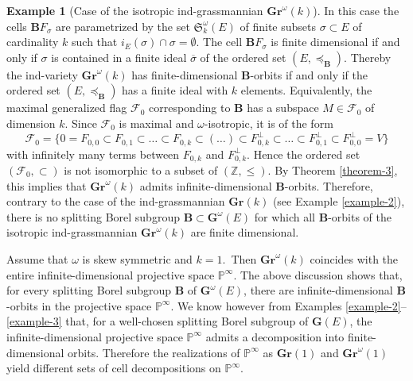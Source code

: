 \documentclass[12pt]{amsart}
\theoremstyle{definition}
\newtheorem{example}{Example}
\begin{document}
\begin{example}[Case of the isotropic ind-grassmannian $\mathbf{Gr}^\omega(k)$]
In this case the cells $\mathbf{B}F_\sigma$ are parametrized by the set $\mathfrak{S}_k^\omega(E)$ of finite subsets $\sigma\subset E$ of cardinality $k$ such that $i_E(\sigma)\cap\sigma=\emptyset$.
The cell $\mathbf{B}F_\sigma$ is finite dimensional if and only if $\sigma$ is contained in a finite ideal $\overline{\sigma}$ of the ordered set $(E,\preceq_\mathbf{B})$. Thereby the ind-variety $\mathbf{Gr}^\omega(k)$ has finite-dimensional $\mathbf{B}$-orbits if and only if the ordered set $(E,\preceq_\mathbf{B})$ has a finite ideal with $k$ elements.
Equivalently, the maximal generalized flag $\mathcal{F}_0$ corresponding to $\mathbf{B}$ has a subspace $M\in\mathcal{F}_0$ of dimension $k$. Since $\mathcal{F}_0$ is maximal and $\omega$-isotropic, it is of the form
\[\mathcal{F}_0=\{0=F_{0,0}\subset F_{0,1}\subset\ldots\subset F_{0,k}\subset(\ldots)\subset F_{0,k}^\perp\subset\ldots\subset F_{0,1}^\perp\subset F_{0,0}^\perp=V\}\]
with infinitely many terms between $F_{0,k}$ and $F_{0,k}^\perp$.
Hence the ordered set $(\mathcal{F}_0,\subset)$ is not isomorphic to a subset of $(\mathbb{Z},\leq)$. By Theorem \ref{theorem-3}, this implies that $\mathbf{Gr}^\omega(k)$ admits infinite-dimensional $\mathbf{B}$-orbits. Therefore, contrary to the case of the  ind-grassmannian $\mathbf{Gr}(k)$ (see Example \ref{example-2}), there is no splitting Borel subgroup $\mathbf{B}\subset\mathbf{G}^\omega(E)$ for which all  $\mathbf{B}$-orbits of the  isotropic ind-grassmannian $\mathbf{Gr}^\omega(k)$ are finite dimensional.

Assume that $\omega$ is skew symmetric and $k=1$.\ Then $\mathbf{Gr}^\omega(k)$ coincides with the entire infinite-dimensional projective space $\mathbb{P}^\infty$. The above discussion shows that, for every splitting Borel subgroup $\mathbf{B}$ of $\mathbf{G}^\omega(E)$, there are  infinite-dimensional $\mathbf{B}$-orbits in the projective space $\mathbb{P}^\infty$. We know however from Examples \ref{example-2}--\ref{example-3} that, for a well-chosen splitting Borel subgroup of $\mathbf{G}(E)$, the infinite-dimensional projective space $\mathbb{P}^\infty$ admits a decomposition into finite-dimensional orbits. Therefore the realizations of $\mathbb{P}^\infty$ as $\mathbf{Gr}(1)$ and $\mathbf{Gr}^\omega(1)$ yield different sets of cell decompositions on $\mathbb{P}^\infty$.
\end{example}
\end{document}
